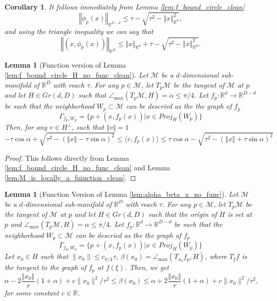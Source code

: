 \documentclass[12pt]{article}
\newtheorem{Lemma}[Theorem]{Lemma}
\newtheorem{corollary}[Theorem]{Corollary}
\theoremstyle{remark}
\newcommand{\RR}{\mathbb{R}}
\newcommand{\MM}{\mathcal{M}}
\newcommand{\norm}[1]{\left\Vert #1 \right\Vert}
\newcommand{\lrangle}[1]{\langle #1 \rangle}
\newcommand{\lrbrackets}[1]{\left( #1 \right)}
\newcommand{\maxangle}{\angle_{\max}}
\begin{document}
\begin{appendices}
\begin{corollary}
It follows immediately from Lemma \ref{lem:f_bound_circle_clean} 
\begin{equation}\label{eq:eq:bound_phix_clean}
    \norm{\phi_p(x)}_{\RR^{D-d}} \leq \tau - \sqrt{\tau^2 - \norm{x}_{\RR^d}^2}
,\end{equation}
and using the triangle inequality we can say that
\begin{equation}\label{eq:bound_x_phix_clean}
    \norm{(x,\phi_p(x))}_{\RR^{D}} \leq \norm{x}_{\RR^d} + \tau - \sqrt{\tau^2 - \norm{x}_{\RR^d}^2}
.\end{equation}
\end{corollary}


\begin{Lemma}[Function version of Lemma \ref{lem:f_bound_circle_H_no_func_clean}]\label{lem:f_bound_circle_H_clean}
    Let $\MM$ be a $d$-dimensional sub-manifold of $\RR^D$ with reach $\tau$. For any $p \in \MM$, let $T_{p}\MM$ be the tangent of $\MM$ at $p$ and let $ H\in Gr(d, D) $ such that $ \maxangle(T_p\MM, H) = \alpha \leq \pi/4$.
	Let $f_p:\RR^d\to \RR^{D-d}$ be such that the neighborhood $W_p\subset\MM$ can be descried as the the graph of $f_p$
	\[\Gamma_{f_p,W_p} = \{p + (x, f_p(x)) | x\in Proj_{H}(W_p)\}\]
	Then, for any $v \in H^\perp$, such that $\norm{v} = 1$
	\[
	-\tau\cos\alpha+\sqrt{\tau^2-(\norm{x} - \tau\sin\alpha)^2} \leq \lrangle{v, f_p(x)} \leq \tau\cos\alpha-\sqrt{\tau^2-(\norm{x} + \tau\sin\alpha)^2}
	\]
\end{Lemma}
\begin{proof}
    This follows directly from Lemma \ref{lem:f_bound_circle_H_no_func_clean} and Lemma \ref{lem:M_is_locally_a_fuinction_clean}.
\end{proof}


\begin{Lemma}[Function Version of Lemma \ref{lem:alpha_beta_x_no_func}]\label{lem:alpha_beta_x}
    Let $\MM$ be a $d$-dimensional sub-manifold of $\RR^D$ with reach $\tau$. 
    For any $p \in \MM$, let $T_{p}\MM$ be the tangent of $\MM$ at $p$ and let $ H\in Gr(d, D) $ such that the origin of $H$ is set at $p$ and $ \maxangle(T_p\MM, H) = \alpha \leq \pi/4$.
	Let $f_p:\RR^d\to \RR^{D-d}$ be such that the neighborhood $W_p\subset\MM$ can be descried as the the graph of $f_p$
	\[\Gamma_{f_p,W_p} = \{p + (x, f_p(x)) | x\in Proj_{H}(W_p)\}\]
    Let $ x_0\in H $ such that $\|x_0\|\leq c_{\pi/4}\tau$, $ \beta(x_0) = \maxangle(T_{x_0}f_p, H) $, where $ T_\xi f $ is the tangent to the graph of $ f_p $ at $ f(\xi) $.
	Then, we get
    \[
      \alpha- 2\frac{\norm{x_0}}{\tau}(1 + \alpha)  +c\|x_0\|^2/\tau^2 \leq \beta(x_0) \leq \alpha+ 2\frac{\norm{x_0}}{\tau}(1 + \alpha)  +c\|x_0\|^2/\tau^2
	 ,\]
    for some constant $c\in \RR$.
\end{Lemma}


\end{appendices}
\end{document}
